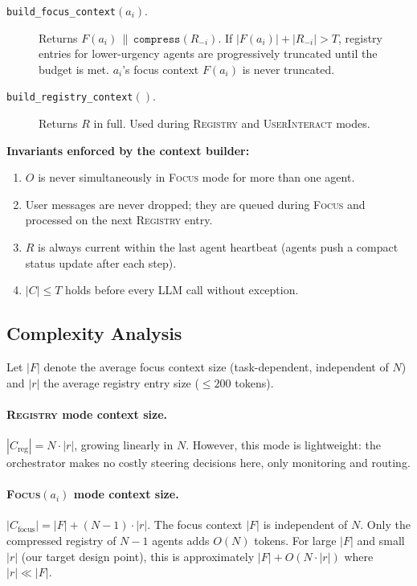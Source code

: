 \documentclass{article}
\begin{document}
\begin{description}
  \item[\texttt{build\_focus\_context}$(a_i)$.]
  Returns $F(a_i) \,\|\, \texttt{compress}(R_{-i})$.
  If $|F(a_i)| + |R_{-i}| > T$, registry entries for lower-urgency
  agents are progressively truncated until the budget is met.
  $a_i$'s focus context $F(a_i)$ is never truncated.

  \item[\texttt{build\_registry\_context}$()$.]
  Returns $R$ in full.
  Used during \textsc{Registry} and \textsc{UserInteract} modes.
\end{description}

\noindent\textbf{Invariants enforced by the context builder:}
\begin{enumerate}
  \item $O$ is never simultaneously in \textsc{Focus} mode for more than
  one agent. \label{inv:1}
  \item User messages are never dropped; they are queued during
  \textsc{Focus} and processed on the next \textsc{Registry} entry.
  \item $R$ is always current within the last agent heartbeat (agents push
  a compact status update after each step). \label{inv:3}
  \item $|C| \leq T$ holds before every LLM call without exception. \label{inv:4}
\end{enumerate}

\subsection{Complexity Analysis}
\label{sec:complexity}

Let $|F|$ denote the average focus context size (task-dependent, independent
of $N$) and $|r|$ the average registry entry size ($\leq 200$ tokens).

\paragraph{\textsc{Registry} mode context size.}
$|C_{\text{reg}}| = N \cdot |r|$, growing linearly in $N$.
However, this mode is lightweight: the orchestrator makes no costly
steering decisions here, only monitoring and routing.

\paragraph{\textsc{Focus}$(a_i)$ mode context size.}
$|C_{\text{focus}}| = |F| + (N-1) \cdot |r|$.
The focus context $|F|$ is independent of $N$.
Only the compressed registry of $N-1$ agents adds $O(N)$ tokens.
For large $|F|$ and small $|r|$ (our target design point), this is
approximately $|F| + O(N \cdot |r|)$ where $|r| \ll |F|$.
\end{document}
